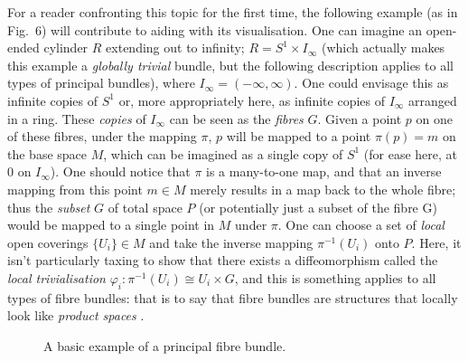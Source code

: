\documentclass[fleqn, twocolumn, 10pt]{article}
\begin{document}
For a reader confronting this topic for the first time, the following example (as in Fig.~6) will contribute to aiding with its visualisation. One can imagine an open-ended cylinder $R$ extending out to infinity; $R = S^1 \times I_\infty$ (which actually makes this example a \textit{globally trivial} bundle, but the following description applies to all types of principal bundles), where $I_\infty = (-\infty, \infty)$. One could envisage this as infinite copies of $S^1$ or, more appropriately here, as infinite copies of $I_\infty$ arranged in a ring. These \textit{copies} of $I_\infty$ can be seen as the \textit{fibres} $G$. Given a point $p$ on one of these fibres, under the mapping $\pi$, $p$ will be mapped to a point $\pi(p) = m$ on the base space $M$, which can be imagined as a single copy of $S^1$ (for ease here, at 0 on $I_\infty$). One should notice that $\pi$ is a many-to-one map, and that an inverse mapping from this point $m \in M$ merely results in a map back to the whole fibre; thus the \textit{subset} $G$ of total space $P$ (or potentially just a subset of the fibre G) would be mapped to a single point in $M$ under $\pi$. One can choose a set of \textit{local} open coverings $\{U_i\} \in M$ and take the inverse mapping $\pi^{-1}(U_i)$ onto $P$. Here, it isn't particularly taxing to show that there exists a diffeomorphism called the \textit{local trivialisation} $\varphi_i: \pi^{-1}(U_i) \cong U_i \times G$, and this is something applies to all types of fibre bundles: that is to say that fibre bundles are structures that locally look like \textit{product spaces} \cite{nakahara2003geometry, kai2015lam, schuller2014geometric, roos2018hopf}.

\begin{figure}[t]
\centering
{}
\caption{A basic example of a principal fibre bundle.}
\end{figure}
\end{document}
